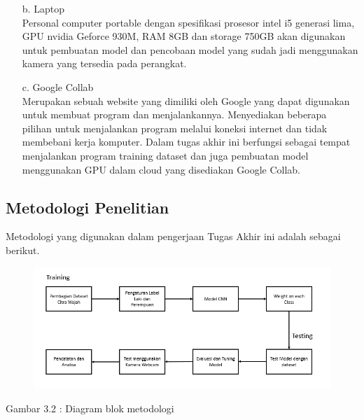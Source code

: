 \begin{itemize}
   \item [b.] Laptop \\
   Personal computer portable dengan spesifikasi prosesor intel i5 generasi lima, GPU nvidia Geforce 930M, 
   RAM 8GB dan storage 750GB akan digunakan untuk pembuatan model dan pencobaan model yang sudah jadi 
   menggunakan kamera yang tersedia pada perangkat.

   \item [c.] Google Collab \\
   Merupakan sebuah website yang dimiliki oleh Google yang dapat digunakan untuk membuat program dan 
   menjalankannya. Menyediakan beberapa pilihan untuk menjalankan program melalui koneksi internet dan 
   tidak membebani kerja komputer. Dalam tugas akhir ini berfungsi sebagai tempat menjalankan program 
   training dataset dan juga pembuatan model menggunakan GPU dalam cloud yang disediakan Google Collab.
\end{itemize}
   

\subsection{Metodologi Penelitian}
Metodologi yang digunakan dalam pengerjaan Tugas Akhir ini adalah sebagai berikut.
    \begin{figure} [H] \centering
      \includegraphics[scale=0.8]{gambar/Metodologi.png}
      \label{fig:Metodologi}
    \end{figure}

    \begin{center}
      Gambar 3.2 : Diagram blok metodologi
    \end{center}

